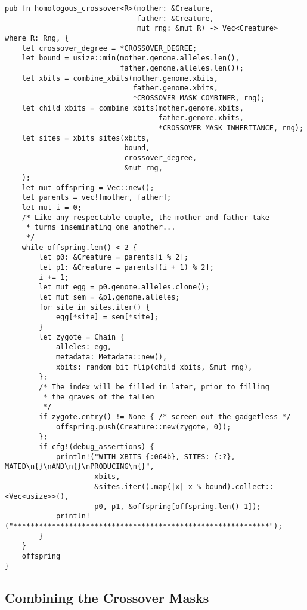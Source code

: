 \documentclass[11pt]{article}
\begin{document}
\lstset{language=rust,label=orge2a97d9,caption= ,captionpos=b,numbers=none}
\begin{lstlisting}
pub fn homologous_crossover<R>(mother: &Creature,
                               father: &Creature,
                               mut rng: &mut R) -> Vec<Creature>
where R: Rng, {
    let crossover_degree = *CROSSOVER_DEGREE;
    let bound = usize::min(mother.genome.alleles.len(), 
                           father.genome.alleles.len());
    let xbits = combine_xbits(mother.genome.xbits, 
                              father.genome.xbits, 
                              *CROSSOVER_MASK_COMBINER, rng);
    let child_xbits = combine_xbits(mother.genome.xbits, 
                                    father.genome.xbits, 
                                    *CROSSOVER_MASK_INHERITANCE, rng);
    let sites = xbits_sites(xbits,
                            bound, 
                            crossover_degree, 
                            &mut rng,
    );
    let mut offspring = Vec::new();
    let parents = vec![mother, father];
    let mut i = 0;
    /* Like any respectable couple, the mother and father take
     * turns inseminating one another...
     */
    while offspring.len() < 2 {
        let p0: &Creature = parents[i % 2];
        let p1: &Creature = parents[(i + 1) % 2];
        i += 1;
        let mut egg = p0.genome.alleles.clone();
        let mut sem = &p1.genome.alleles;
        for site in sites.iter() {
            egg[*site] = sem[*site];
        }
        let zygote = Chain {
            alleles: egg,
            metadata: Metadata::new(),
            xbits: random_bit_flip(child_xbits, &mut rng),
        };
        /* The index will be filled in later, prior to filling
         * the graves of the fallen
         */
        if zygote.entry() != None { /* screen out the gadgetless */
            offspring.push(Creature::new(zygote, 0));
        };
        if cfg!(debug_assertions) {
            println!("WITH XBITS {:064b}, SITES: {:?}, MATED\n{}\nAND\n{}\nPRODUCING\n{}",
                     xbits,
                     &sites.iter().map(|x| x % bound).collect::<Vec<usize>>(),
                     p0, p1, &offspring[offspring.len()-1]);
            println!("************************************************************");
        }
    }
    offspring
}
\end{lstlisting}

\subsection{Combining the Crossover Masks}
\label{sec:org99fa4de}
\label{org5b8dd2b}
\end{document}
